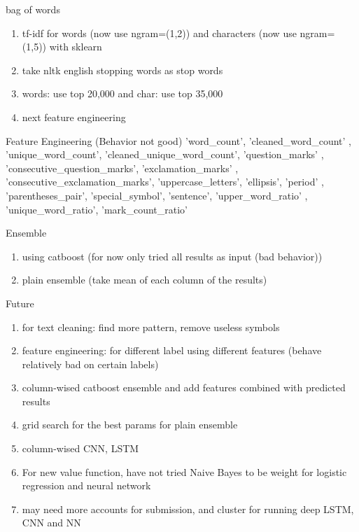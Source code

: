 \documentclass{beamer}
\begin{document}
\begin{frame}{bag of words}
\begin{enumerate}
	\item tf-idf for words (now use ngram=(1,2)) and characters (now use ngram=(1,5)) with sklearn
	\item take nltk english stopping words as stop words
	\item words: use top 20,000 and char: use top 35,000
	\item next feature engineering
\end{enumerate}
\end{frame}

\begin{frame}{Feature Engineering (Behavior not good)}
 'word\_count', 'cleaned\_word\_count'
, 'unique\_word\_count', 'cleaned\_unique\_word\_count', 'question\_marks'
, 'consecutive\_question\_marks', 'exclamation\_marks'
, 'consecutive\_exclamation\_marks', 'uppercase\_letters', 'ellipsis', 'period'
, 'parentheses\_pair', 'special\_symbol', 'sentence', 'upper\_word\_ratio'
, 'unique\_word\_ratio', 'mark\_count\_ratio'
\end{frame}

\begin{frame}{Ensemble}
\begin{enumerate}
	\item using catboost (for now only tried all results as input (bad behavior))
	\item plain ensemble (take mean of each column of the results)
\end{enumerate}
\end{frame}

\begin{frame}{Future}
\begin{enumerate}
	\item for text cleaning: find more pattern, remove useless symbols
	\item feature engineering: for different label using different features (behave relatively bad on certain labels)
	\item column-wised catboost ensemble and add features combined with predicted results
	\item grid search for the best params for plain ensemble
	\item column-wised CNN, LSTM
	\item For new value function, have not tried Naive Bayes to be weight for logistic regression and neural network
	\item may need more accounts for submission, and cluster for running deep LSTM, CNN and NN
\end{enumerate}
\end{frame}
\end{document}
